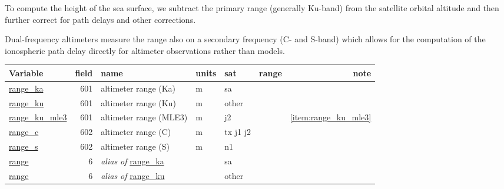\documentclass[a4paper,11pt,openany,natbib]{thesis}
\makeatletter
\newcommand\var[1]{\url{#1}\index{variables!#1@\protect\url{#1}}}
\newcommand\alias[1]{\emph{alias of} \var{#1}}
\newenvironment{vartable}{
\begin{table}[ht]
\small
\begin{tabular}{lrllllr}
\hline
Variable & field & name & units & sat & range & note \\
\hline
}{
\hline
\end{tabular}
\end{table}
}
\makeatother
\begin{document}
To compute the height of the sea surface, we subtract the primary range (generally Ku-band) from the satellite orbital altitude and then further correct for path delays and other corrections.

Dual-frequency altimeters measure the range also on a secondary frequency (C- and S-band) which allows for the computation of the ionospheric path delay directly for altimeter observations rather than models.

\begin{vartable}
\var{range_ka} & 601 & altimeter range (Ka) & m & sa & & \\
\var{range_ku} & 601 & altimeter range (Ku) & m & other & & \\
\var{range_ku_mle3} & 601 & altimeter range (MLE3) & m & j2 & & \ref{item:range_ku_mle3} \\
\var{range_c}  & 602 & altimeter range (C) & m & tx j1 j2 & & \\
\var{range_s}  & 602 & altimeter range (S) & m & n1 & & \\
\hline
\var{range} & 6 & \alias{range_ka} & & sa & & \\
\var{range} & 6 & \alias{range_ku} & & other & & \\
\end{vartable}
\end{document}
